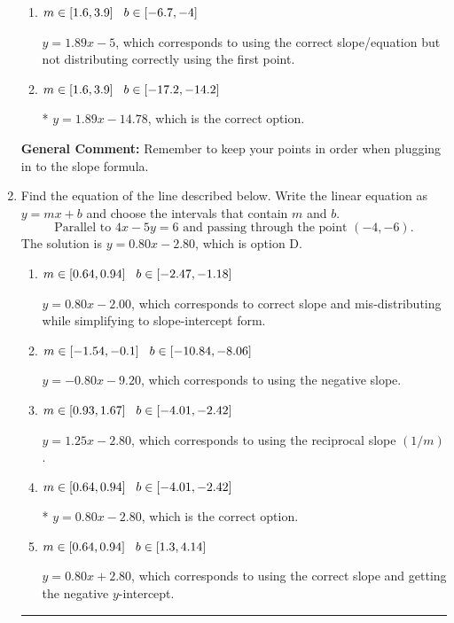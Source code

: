 \documentclass{extbook}[14pt]
\newcommand{\litem}[1]{\item #1

\rule{\textwidth}{0.4pt}}
\begin{document}
\begin{enumerate}
{\begin{enumerate}[label=\Alph*.]
 $y = 1.89x + 14.78$, which corresponds to using the correct slope and getting the negative y-intercept.
\item \( m \in [1.6, 3.9] \hspace*{3mm} b \in [-6.7, -4] \)

 $y = 1.89x -5$, which corresponds to using the correct slope/equation but not distributing correctly using the first point.
\item \( m \in [1.6, 3.9] \hspace*{3mm} b \in [-17.2, -14.2] \)

* $y = 1.89x -14.78$, which is the correct option.
\end{enumerate}

\textbf{General Comment:} Remember to keep your points in order when plugging in to the slope formula.
}
\litem{
Find the equation of the line described below. Write the linear equation as $ y=mx+b $ and choose the intervals that contain $m$ and $b$.
\[ \text{Parallel to } 4 x - 5 y = 6 \text{ and passing through the point } (-4, -6). \]The solution is \( y = 0.80x - 2.80 \), which is option D.\begin{enumerate}[label=\Alph*.]
\item \( m \in [0.64, 0.94] \hspace*{3mm} b \in [-2.47, -1.18] \)

 $y = 0.80x - 2.00$, which corresponds to correct slope and mis-distributing while simplifying to slope-intercept form.
\item \( m \in [-1.54, -0.1] \hspace*{3mm} b \in [-10.84, -8.06] \)

 $y = -0.80x - 9.20$, which corresponds to using the negative slope.
\item \( m \in [0.93, 1.67] \hspace*{3mm} b \in [-4.01, -2.42] \)

 $y = 1.25x - 2.80$, which corresponds to using the reciprocal slope $(1/m)$.
\item \( m \in [0.64, 0.94] \hspace*{3mm} b \in [-4.01, -2.42] \)

* $y = 0.80x - 2.80$, which is the correct option.
\item \( m \in [0.64, 0.94] \hspace*{3mm} b \in [1.3, 4.14] \)

 $y = 0.80x + 2.80$, which corresponds to using the correct slope and getting the negative $y$-intercept.
\end{enumerate}

}
\end{enumerate}
\end{document}
